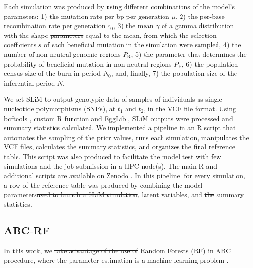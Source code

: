 \documentclass[a4paper, 12pt]{article}
\providecommand{\DIFaddtex}[1]{{\protect\color{blue}\uwave{#1}}} %
\providecommand{\DIFdeltex}[1]{{\protect\color{red}\sout{#1}}}                      %
\providecommand{\DIFaddbegin}{} %
\providecommand{\DIFaddend}{} %
\providecommand{\DIFdelbegin}{} %
\providecommand{\DIFdelend}{} %
\providecommand{\DIFadd}[1]{\texorpdfstring{\DIFaddtex{#1}}{#1}} %
\providecommand{\DIFdel}[1]{\texorpdfstring{\DIFdeltex{#1}}{}} %
\newcommand{\DIFscaledelfig}{0.5}
\newlength{\DIFdelgraphicswidth} %
\newlength{\DIFdelgraphicsheight} %
\newcommand{\DIFaddincludegraphics}[2][]{{\color{blue}\fbox{\DIFOincludegraphics[#1]{#2}}}} %
\newcommand{\DIFdelincludegraphics}[2][]{%
\sbox{\DIFdelgraphicsbox}{\DIFOincludegraphics[#1]{#2}}%
\settoboxwidth{\DIFdelgraphicswidth}{\DIFdelgraphicsbox} %
\settoboxtotalheight{\DIFdelgraphicsheight}{\DIFdelgraphicsbox} %
\scalebox{\DIFscaledelfig}{%
\parbox[b]{\DIFdelgraphicswidth}{\usebox{\DIFdelgraphicsbox}\\[-\baselineskip] \rule{\DIFdelgraphicswidth}{0em}}\llap{\resizebox{\DIFdelgraphicswidth}{\DIFdelgraphicsheight}{%
\setlength{\unitlength}{\DIFdelgraphicswidth}%
\begin{picture}(1,1)%
\thicklines\linethickness{2pt} %
{\color[rgb]{1,0,0}\put(0,0){\framebox(1,1){}}}%
{\color[rgb]{1,0,0}\put(0,0){\line( 1,1){1}}}%
{\color[rgb]{1,0,0}\put(0,1){\line(1,-1){1}}}%
\end{picture}%
}\hspace*{3pt}}} %
} %
\DeclareRobustCommand{\DIFaddbegin}{\DIFOaddbegin \let\includegraphics\DIFaddincludegraphics} %
\DeclareRobustCommand{\DIFaddend}{\DIFOaddend \let\includegraphics\DIFOincludegraphics} %
\DeclareRobustCommand{\DIFdelbegin}{\DIFOdelbegin \let\includegraphics\DIFdelincludegraphics} %
\DeclareRobustCommand{\DIFdelend}{\DIFOaddend \let\includegraphics\DIFOincludegraphics} %
\begin{document}
Each simulation was produced by using different combinations of the model's parameters: 1) the mutation rate per bp per generation $\mu$, 2) the per-base recombination rate per generation \DIFdelbegin \DIFdel{$c_{\mathrm{0}}$}\DIFdelend \DIFaddbegin \DIFadd{$r$}\DIFaddend , 3) the mean $\gamma$ of a gamma distribution \DIFaddbegin \DIFadd{(}\DIFaddend with the shape \DIFdelbegin \DIFdel{parameters }\DIFdelend \DIFaddbegin \DIFadd{parameter }\DIFaddend equal to the mean\DIFaddbegin \DIFadd{)}\DIFaddend , from which the selection coefficients $s$ of each beneficial mutation in the simulation were sampled, 4) the number of non-neutral genomic regions $P_\mathrm{R}$, 5) the parameter that determines the probability of beneficial mutation in non-neutral regions $P_\mathrm{B}$, 6) the population census size of the burn-in period $N_\mathrm{0}$, and, finally, 7) the population size of the inferential period $N$.

We set SLiM to output genotypic data of samples of individuals as single nucleotide polymorphisms (SNPs), at $t_1$ and $t_2$, in the VCF file format. Using bcftools \citep{Li:2011kr}, custom R function \citep{Rcore} and EggLib \citep{DeMita:2012dx}, SLiM outputs were processed and summary statistics calculated. We implemented a pipeline in an R script that automates the sampling of the prior values, runs each simulation, manipulates the VCF files, calculates the summary statistics, and organizes the final reference table. This script was also produced to facilitate the model test with \DIFaddbegin \DIFadd{a }\DIFaddend few simulations and the job submission in \DIFdelbegin \DIFdel{a }\DIFdelend \DIFaddbegin \DIFadd{an }\DIFaddend HPC node(s). The main R and additional scripts are available on Zenodo \citep{Pavinato:2021}. In this pipeline, for every simulation, a row of the reference table was produced by combining the model parameters\DIFdelbegin \DIFdel{used to launch a SLiM simulation}\DIFdelend , latent variables, and \DIFdelbegin \DIFdel{the }\DIFdelend summary statistics.

\subsection*{ABC-RF}

In this work, we \DIFdelbegin \DIFdel{take advantage of the use of }\DIFdelend \DIFaddbegin \DIFadd{use }\DIFaddend Random Forests (RF) in \DIFaddbegin \DIFadd{the }\DIFaddend ABC procedure, where the parameter estimation is a machine learning problem \citep{Pudlo:2016il, Raynal:2019jj}. \DIFdelbegin %
\end{document}
